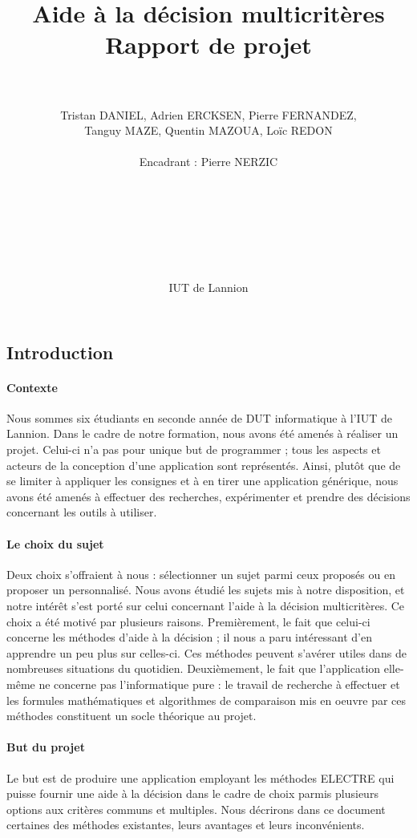 \documentclass[a4paper]{article}
\title{Aide à la décision multicritères \\ Rapport de projet}
\author{\\\\ Tristan DANIEL, Adrien ERCKSEN, Pierre FERNANDEZ,\\ Tanguy MAZE, Quentin MAZOUA, Loïc REDON \\\\ Encadrant : Pierre NERZIC \\\\\\\\\\\\\\\\ IUT de Lannion}
\begin{document}
\maketitle

\newpage

\subsection*{Introduction}

\paragraph{Contexte}
Nous sommes six étudiants en seconde année de DUT informatique à l'IUT de Lannion. Dans le cadre de notre formation, nous avons été amenés à réaliser un projet. Celui-ci n'a pas pour unique but de programmer ; tous les aspects et acteurs de la conception d'une application sont représentés. Ainsi, plutôt que de se limiter à appliquer les consignes et à en tirer une application générique, nous avons été amenés à effectuer des recherches, expérimenter et prendre des décisions concernant les outils à utiliser.

\paragraph{Le choix du sujet}
Deux choix s'offraient à nous : sélectionner un sujet parmi ceux proposés ou en proposer un personnalisé. Nous avons étudié les sujets mis à notre disposition, et notre intérêt s'est porté sur celui concernant l'aide à la décision multicritères. Ce choix a été motivé par plusieurs raisons. Premièrement, le fait que celui-ci concerne les méthodes d'aide à la décision ; il nous a paru intéressant d'en apprendre un peu plus sur celles-ci. Ces méthodes peuvent s'avérer utiles dans de nombreuses situations du quotidien. Deuxièmement, le fait que l'application elle-même ne concerne pas l'informatique pure : le travail de recherche à effectuer et les formules mathématiques et algorithmes de comparaison mis en oeuvre par ces méthodes constituent un socle théorique au projet.

\paragraph{But du projet}
Le but est de produire une application employant les méthodes ELECTRE qui puisse fournir une aide à la décision dans le cadre de choix parmis plusieurs options aux critères communs et multiples. Nous décrirons dans ce document certaines des méthodes existantes, leurs avantages et leurs inconvénients.
\end{document}
